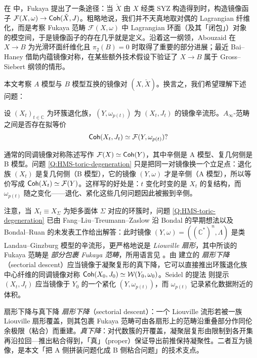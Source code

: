 在 \cite{Fukaya05} 中，Fukaya 提出了一条途径：当 $\check{X}$ 由 $X$ 经类 SYZ 构造得到时，构造镜像函子 $\mathcal{F} (X,\omega)\to\operatorname{\mathsf{Coh}} (\check{X},J)$。粗略地说，我们并不天真地取对偶的 Lagrangian 纤维化，而是考察 Fukaya 范畴 $\mathcal{F} (X,\omega)$ 中 Lagrangian 环面（及其「闭包」）对象的模空间，于是镜像函子的存在几乎就是定义。沿着这一纲领，Abouzaid \cite{Abouzaid21} 在 $X\to B$ 为光滑环面纤维化且 $\pi_2(B)=0$ 时取得了重要的部分进展；最近 Bai--Haney \cite{BH26} 借助内蕴镜像对称，在某些额外技术假设下验证了 $X\to B$ 属于 Gross--Siebert 纲领的情形。

本文考察 $A$ 模型与 $B$ 模型互换的镜像对 $(X,\check{X})$。换言之，我们希望理解下述问题：

\begin{ques}\label{Q:HMS-toric-degeneration}
    设 $(X_t)_{t\in\mathbb{C}}$ 为环簇退化族，$(Y,\omega_{p(t)})$ 为 $(X_t, J_t)$ 的镜像辛流形。$A_{\infty}$-范畴之间是否存在拟等价
\[
        \operatorname{\mathsf{Coh}} (X_t,J_t)\simeq\mathcal{F} (Y,\omega_{p(t)})?
    \]
\end{ques}

\begin{yizhu}
通常的同调镜像对称陈述写作 $\mathcal{F}(X)\simeq\operatorname{\mathsf{Coh}}(Y)$，其中辛侧是 A 模型、复几何侧是 B 模型。问题 \ref{Q:HMS-toric-degeneration} 只是把同一对镜像换一个立足点：退化族 $(X_t)$ 是复几何侧（B 模型），它的镜像 $(Y,\omega)$ 才是辛侧（A 模型），所以等价写成 $\operatorname{\mathsf{Coh}}(X_t)\simeq\mathcal{F}(Y)$。这样写的好处是：$t$ 变化时变的是 $X_t$ 的复结构，而 $\omega_{p(t)}$ 随之变化——退化、紧化这些几何问题因此被搬到辛侧。
\end{yizhu}

注意，当 $X_t\equiv X_{\Sigma}$ 为矩多面体 $\Sigma$ 对应的环簇时，问题 \ref{Q:HMS-toric-degeneration} 已由 Fang--Liu--Treumann--Zaslow \cite{FLTZ12} 沿 Bondal \cite{Bondal06} 的早期想法以及 Bondal--Ruan 的未发表工作给出解答：此时镜像 $(Y,\omega)=\left((\mathbb{C}^{\ast})^n,\Lambda\right)$ 是类 Landau--Ginzburg 模型的辛流形，更严格地说是 \emph{Liouville 扇形}，其中所谈的 Fukaya 范畴是 \emph{部分包裹 Fukaya 范畴}，所用语言见 \cite{GPS20,GPS24M}。由 \cite{GPS24S} 建立的 \emph{扇形下降}（sectorial descent）应当镜像于凝聚复形的真下降，它可以直接推出环簇退化族中心纤维的同调镜像对称 $\operatorname{\mathsf{Coh}} (X_0,J_0)\simeq\mathcal{W} (Y_0,\omega_0)$。Seidel 的提法 \cite{Seidel02} 则提示 $(X_t,J_t)$ 应当镜像于 $Y_0$ 的一个紧化 $(Y,\omega_{p(t)})$，而 $\omega_{p(t)}$ 记录紧化数据附近的体积。

\begin{conceptbox}{扇形下降与真下降}
\emph{扇形下降}（sectorial descent）：一个 Liouville 流形若被一族 Liouville 扇形覆盖，则其包裹 Fukaya 范畴可由各扇形上的范畴沿重叠部分作同伦余极限（粘合）而重建。\emph{真下降}：对代数簇的开覆盖，凝聚层复形由限制到各开集再沿拉回—推出粘合得到，「真」（proper）保证导出前推保持凝聚性。二者互为镜像，是本文「把 A 侧拼装问题化成 B 侧粘合问题」的技术支点。
\par\smallskip{}
\end{conceptbox}

